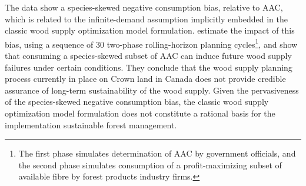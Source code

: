 

The data show a species-skewed negative consumption bias, relative to AAC, which is related to the infinite-demand assumption implicitly embedded in the classic wood supply optimization model formulation. 
\citet{paradis2013risk} estimate the impact of this bias, using a sequence of 30 two-phase rolling-horizon planning cycles\footnote{The first phase simulates determination of AAC by government officials, and the second phase simulates consumption of a profit-maximizing subset of available fibre by forest products industry firms.}, and show that consuming a species-skewed subset of AAC can induce future wood supply failures under certain conditions. They conclude that the wood supply planning process currently in place on Crown land in Canada does not provide credible assurance of long-term sustainability of the wood supply. Given the pervasiveness of the species-skewed negative consumption bias, the classic wood supply optimization model formulation does not constitute a rational basis for the implementation sustainable forest management. 







